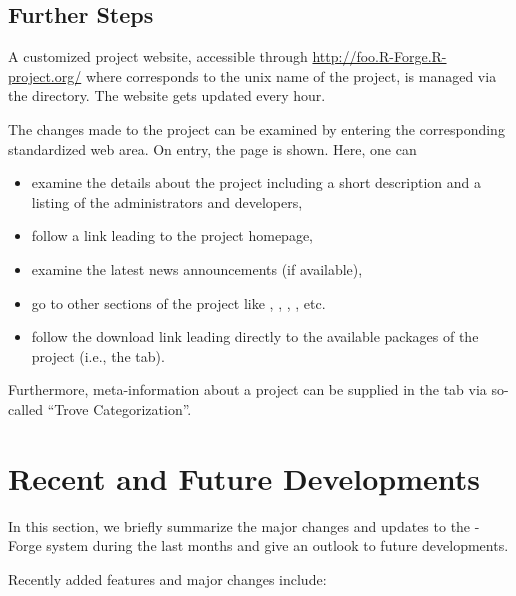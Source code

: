 \subsection{Further Steps}

A customized project website, accessible through
\url{http://foo.R-Forge.R-project.org/} where  
corresponds to the unix name of the project, is managed via the
 directory. The website gets updated every hour. 

The changes made to the project can be examined by entering the
corresponding standardized web area. On entry, the 
page is shown. Here, one can 

\begin{itemize}
\item examine the details about the project including a short
  description and a listing of the administrators and developers,
\item follow a link leading to the project homepage,
\item examine the latest news announcements (if available),
\item go to other sections of the project like
  , ,
   , , etc.
\item follow the download link leading directly to the available
  packages of the project (i.e., the  tab).
\end{itemize}

Furthermore, meta-information about a project can be supplied in
the  tab via so-called ``Trove Categorization''. 


\section*{Recent and Future Developments}

In this section, we briefly summarize the major changes and updates to
the \R{}-Forge system during the last months and give an outlook to
future developments. 

Recently added features and major changes include:


